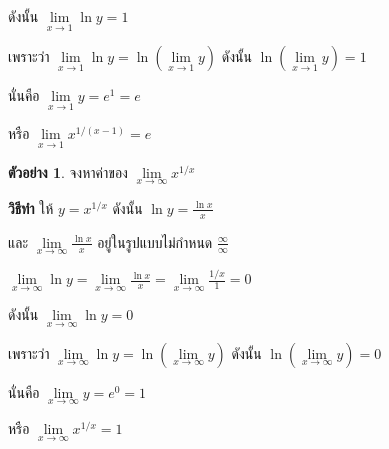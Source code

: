 \documentclass[
]{book}
\theoremstyle{definition}
\theoremstyle{definition}
\newtheorem{example}{ตัวอย่าง}[chapter]
\theoremstyle{definition}
\theoremstyle{definition}
\theoremstyle{remark}
\begin{document}
ดังนั้น \(\mathop {\lim }\limits_{x\to 1} \ln y=1\)

เพราะว่า \(\mathop {\lim }\limits_{x\to 1} \ln y=\ln (\mathop {\lim
}\limits_{x\to 1} y)\) ดังนั้น \(\ln (\mathop {\lim }\limits_{x\to 1} y)=1\)

นั่นคือ \(\mathop {\lim }\limits_{x\to 1} y=e^1=e\)

หรือ \(\mathop {\lim }\limits_{x\to 1} x^{1/(x-1)}=e\)

\begin{example}
จงหาค่าของ \(\mathop {\lim }\limits_{x\to \infty } x^{1/x}\)
\end{example}

\textbf{วิธีทำ} ให้ \(y=x^{1/x}\) ดังนั้น \(\displaystyle \ln y=\frac{\ln x}{x}\)

และ
\(\displaystyle \mathop {\lim }\limits_{x\to \infty } \frac{\ln x}{x}\)
อยู่ในรูปแบบไม่กำหนด \(\displaystyle \frac{\infty }{\infty }\)

\(\displaystyle \mathop {\lim }\limits_{x\to \infty } \ln y=\mathop {\lim
}\limits_{x\to
\infty } \frac{\ln x}{x}=\mathop {\lim }\limits_{x\to \infty }
\frac{1/x}{1}=0\)

ดังนั้น \(\mathop {\lim }\limits_{x\to \infty } \ln y=0\)

เพราะว่า \(\mathop {\lim }\limits_{x\to \infty } \ln y=\ln (\mathop {\lim
}\limits_{x\to \infty } y)\) ดังนั้น \(\ln (\mathop {\lim }\limits_{x\to
\infty } y)=0\)

นั่นคือ \(\mathop {\lim }\limits_{x\to \infty } y=e^0=1\)

หรือ \(\mathop {\lim }\limits_{x\to \infty } x^{1/x}=1\)

  
\end{document}
